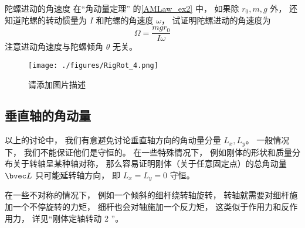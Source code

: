 \begin{exercise}{陀螺进动的角速度}\label{RigRot_exe1}
在“角动量定理” 的\autoref{AMLaw_ex2} 中， 如果除 $r_0, m, g$ 外， 还知道陀螺的转动惯量为 $I$ 和陀螺的角速度 $\omega$， 试证明陀螺进动的角速度为
\begin{equation}
\Omega = \frac{mgr_0}{I\omega}
\end{equation}
注意进动角速度与陀螺倾角 $\theta$ 无关。
\end{exercise}

\begin{example}{}\label{RigRot_ex2}
\begin{figure}[ht]
\centering
\texttt{[image: ./figures/RigRot\_4.png]}
\caption{请添加图片描述} \label{RigRot_fig4}
\end{figure}
\end{example}

\subsection{垂直轴的角动量}
以上的讨论中， 我们有意避免讨论垂直轴方向的角动量分量 $L_x, L_y$。 一般情况下， 我们不能保证他们是守恒的。 在一些特殊情况下， 例如刚体的形状和质量分布关于转轴呈某种轴对称， 那么容易证明刚体（关于任意固定点）的总角动量 $\bvec L$ 只可能延转轴方向， 即 $L_x = L_y = 0$ 守恒。 %

在一些不对称的情况下， 例如一个倾斜的细杆绕转轴旋转， %
转轴就需要对细杆施加一个不停旋转的力矩， 细杆也会对轴施加一个反力矩， 这类似于作用力和反作用力， 详见“刚体定轴转动 2 ”。
